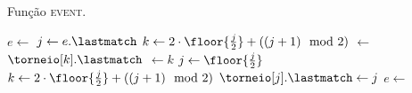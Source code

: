 \begin{algorithm}[H]
    \caption{Função \textsc{event}.} \label{torneioi:evento}
    \begin{algorithmic}[1]
            \State $e \leftarrow  $ 
                \State $j \leftarrow e.\lastmatch$
                \State $k \leftarrow 2\cdot \floor{\frac{j}{2}}
                + ((j + 1)\mod2)$ 
                    \State {}
                    $\leftarrow~$\torneio[$j$]
                    \State $\torneio[k].\lastmatch$ $\leftarrow k$
                    \State {}
                    \State $j \leftarrow \floor{\frac{j}{2}}$
                    \State $k \leftarrow 2\cdot \floor{\frac{j}{2}}
                    + ((j + 1)\mod2)$ 
                \EndWhile
                \State $\torneio[j].\lastmatch \leftarrow j$
                \State {}
                \State $e \leftarrow  $ 
            \EndWhile
        \EndFunction
    \end{algorithmic}
\end{algorithm}